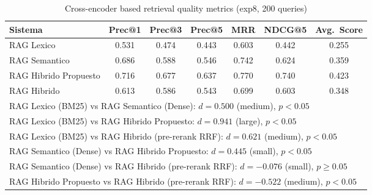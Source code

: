 \begin{table}[htbp]
\centering
\caption{Cross-encoder based retrieval quality metrics (exp8, 200 queries)}
\label{tab:retrieval-metrics}
\begin{tabular}{lcccccc}
\toprule
Sistema & Prec@1 & Prec@3 & Prec@5 & MRR & NDCG@5 & Avg.~Score \\
\midrule
RAG Lexico & 0.531 & 0.474 & 0.443 & 0.603 & 0.442 & 0.255 \\
RAG Semantico & 0.686 & 0.588 & 0.546 & 0.742 & 0.624 & 0.359 \\
RAG Hibrido Propuesto & 0.716 & 0.677 & 0.637 & 0.770 & 0.740 & 0.423 \\
RAG Hibrido & 0.613 & 0.586 & 0.543 & 0.699 & 0.603 & 0.348 \\
\midrule
\multicolumn{7}{l}{\footnotesize RAG Lexico (BM25) vs RAG Semantico (Dense): $d=0.500$ (medium), $p<0.05$} \\
\multicolumn{7}{l}{\footnotesize RAG Lexico (BM25) vs RAG Hibrido Propuesto: $d=0.941$ (large), $p<0.05$} \\
\multicolumn{7}{l}{\footnotesize RAG Lexico (BM25) vs RAG Hibrido (pre-rerank RRF): $d=0.621$ (medium), $p<0.05$} \\
\multicolumn{7}{l}{\footnotesize RAG Semantico (Dense) vs RAG Hibrido Propuesto: $d=0.445$ (small), $p<0.05$} \\
\multicolumn{7}{l}{\footnotesize RAG Semantico (Dense) vs RAG Hibrido (pre-rerank RRF): $d=-0.076$ (small), $p\geq0.05$} \\
\multicolumn{7}{l}{\footnotesize RAG Hibrido Propuesto vs RAG Hibrido (pre-rerank RRF): $d=-0.522$ (medium), $p<0.05$} \\
\bottomrule
\end{tabular}
\end{table}